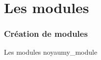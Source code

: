 %
%
%

\part{Les modules}
\section{Création de modules}

\begin{frame}[fragile=singleslide]{Les modules noyau}{my\_module}
  
\end{frame}

